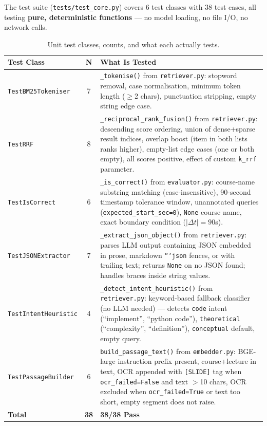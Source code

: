 \documentclass[12pt,a4paper]{article}
\begin{document}
The test suite (\texttt{tests/test\_core.py}) covers 6 test classes with 38 test cases, all testing \textbf{pure, deterministic functions} — no model loading, no file I/O, no network calls.

\begin{table}[H]
\centering
\small
\caption{Unit test classes, counts, and what each actually tests.}
\label{tab:tests}
\begin{tabular}{>{}p{3cm} c p{8cm}}
\toprule
\textbf{Test Class} & \textbf{N} & \textbf{What Is Tested} \\
\midrule
\texttt{TestBM25Tokeniser} & 7 &
  \texttt{\_tokenise()} from \texttt{retriever.py}: stopword removal, case normalisation, minimum token length ($\geq$2 chars), punctuation stripping, empty string edge case. \\
\addlinespace
\texttt{TestRRF} & 8 &
  \texttt{\_reciprocal\_rank\_fusion()} from \texttt{retriever.py}: descending score ordering, union of dense+sparse result indices, overlap boost (item in both lists ranks higher), empty-list edge cases (one or both empty), all scores positive, effect of custom \texttt{k\_rrf} parameter. \\
\addlinespace
\texttt{TestIsCorrect} & 6 &
  \texttt{\_is\_correct()} from \texttt{evaluator.py}: course-name substring matching (case-insensitive), 90-second timestamp tolerance window, unannotated queries (\texttt{expected\_start\_sec=0}), \texttt{None} course name, exact boundary condition ($|\Delta t| = 90$s). \\
\addlinespace
\texttt{TestJSONExtractor} & 7 &
  \texttt{\_extract\_json\_object()} from \texttt{retriever.py}: parses LLM output containing JSON embedded in prose, markdown \texttt{```json} fences, or with trailing text; returns \texttt{None} on no JSON found; handles braces inside string values. \\
\addlinespace
\texttt{TestIntentHeuristic} & 4 &
  \texttt{\_detect\_intent\_heuristic()} from \texttt{retriever.py}: keyword-based fallback classifier (no LLM needed) — detects \texttt{code} intent (``implement'', ``python code''), \texttt{theoretical} (``complexity'', ``definition''), \texttt{conceptual} default, empty query. \\
\addlinespace
\texttt{TestPassageBuilder} & 6 &
  \texttt{build\_passage\_text()} from \texttt{embedder.py}: BGE-large instruction prefix present, course+lecture in text, OCR appended with \texttt{[SLIDE]} tag when \texttt{ocr\_failed=False} and text $>$10 chars, OCR excluded when \texttt{ocr\_failed=True} or text too short, empty segment does not raise. \\
\midrule
\textbf{Total} & \textbf{38} & \textbf{38/38 Pass} \\
\bottomrule
\end{tabular}
\end{table}
\end{document}
